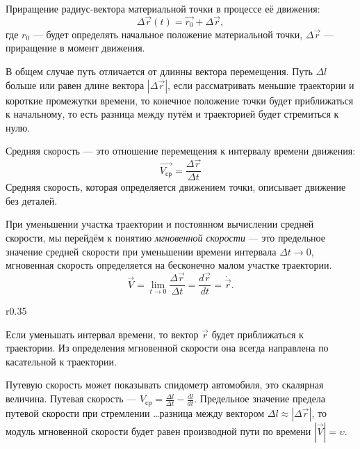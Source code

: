 \documentclass[10pt]{scrbook}
\begin{document}
Приращение радиус-вектора материальной точки в процессе её движения: \[
	\Delta \vec{r}(t) = \vec{r_0} + \Delta \vec{r}
	,\] где \( r_0 \) --- будет определять начальное положение материальной точки,
\( \Delta \vec{r} \) --- приращение в момент движения.

В общем случае путь отличается от длинны вектора перемещения. Путь \( \Delta l
\) больше или равен длине вектора \( |\Delta \vec{r}| \), если рассматривать
меньшие траектории и короткие промежутки времени, то конечное положение точки
будет приближаться к начальному, то есть разница между путём и траекторией
будет стремиться к нулю.

Средняя скорость --- это отношение перемещения к интервалу времени движения:
\begin{equation}
	\vec{V_\text{ср}} = \frac{\Delta \vec{r}}{\Delta t}
\end{equation}
Средняя скорость, которая определяется движением точки, описывает движение без
деталей.

При уменьшении участка траектории и постоянном вычислении средней скорости, мы
перейдём к понятию \emph{мгновенной скорости} --- это предельное значение
средней скорости при уменьшении времени интервала \( \Delta t \to 0 \),
мгновенная скорость определяется на бесконечно малом участке траектории.
\[
	\vec{V} = \lim_{t \to 0} \frac{\Delta \vec{r}}{\Delta t} = \frac{d \vec{r}}{d
		t} = \dot{\vec{r}}
	.\]

\begin{wrapfigure}{r}{0.35\textwidth}
	\begin{center}
	\end{center}
\end{wrapfigure}

Если уменьшать интервал времени, то вектор \( \vec{r} \) будет приближаться к
траектории. Из определения мгновенной скорости она всегда направлена по
касательной к траектории.

Путевую скорость может показывать спидометр
автомобиля, это скалярная величина. Путевая скорость --- \( V_\text{ср} =
\frac{\Delta l}{\Delta t} - \frac{d l}{d t} \). Предельное значение предела
путевой скорости при стремлении \ldots разница между вектором \( \Delta l
\approx |\Delta \vec{r}| \), то модуль мгновенной скорости будет равен
производной пути по времени \( |\vec{V}| = \upsilon \).
\end{document}
